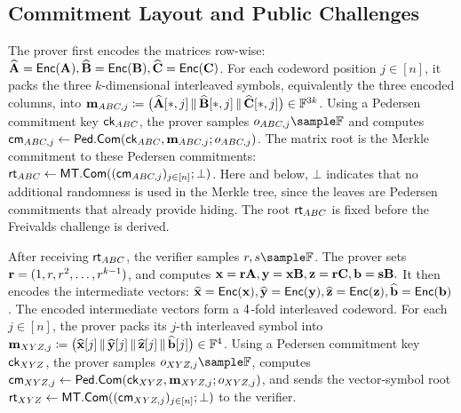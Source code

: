 \subsection{Commitment Layout and Public Challenges}
\label{sec:commitment-challenge}

The prover first encodes the matrices row-wise:
{\footnotesize
\(\widehat{\mathbf{A}}=\mathsf{Enc}(\mathbf{A}),
  \widehat{\mathbf{B}}=\mathsf{Enc}(\mathbf{B}),
  \widehat{\mathbf{C}}=\mathsf{Enc}(\mathbf{C})\).
}
For each codeword position \(j\in[n]\), it packs the three \(k\)-dimensional
interleaved symbols, equivalently the three encoded columns, into
{\footnotesize
\(\mathbf{m}_{ABC,j}
  \coloneqq
  \big(
    \widehat{\mathbf{A}}[*,j]\,
    \|\,\widehat{\mathbf{B}}[*,j]\,
    \|\,\widehat{\mathbf{C}}[*,j]
  \big)
  \in\mathbb{F}^{3k}\).
}
Using a Pedersen commitment key \({\textsf{ck}}_{ABC}\), the prover samples
\(o_{ABC,j}\sample\mathbb{F}\) and computes
{\footnotesize
\(\textsf{cm}_{ABC,j}
  \gets
  \textsf{Ped.Com}({\textsf{ck}}_{ABC},\mathbf{m}_{ABC,j};o_{ABC,j})\).
}
The matrix root is the Merkle commitment to these Pedersen commitments:
{\footnotesize
\(\textsf{rt}_{ABC}
  \gets
  \textsf{MT.Com}((\textsf{cm}_{ABC,j})_{j\in[n]};\bot)\).
}
Here and below, \(\bot\) indicates that no additional randomness is used in the
Merkle tree, since the leaves are Pedersen commitments that already provide
hiding. The root \(\textsf{rt}_{ABC}\) is fixed before the Freivalds challenge is
derived.

After receiving \(\textsf{rt}_{ABC}\), the verifier samples \(r, \revmath{s}\sample\mathbb{F}\). 
The prover sets {\footnotesize \(\mathbf{r}=(1,r,r^2,\ldots,r^{k-1})\), }
and computes
{\footnotesize
\(\mathbf{x}=\mathbf{r}\mathbf{A},
  \mathbf{y}=\mathbf{x}\mathbf{B},
  \mathbf{z}=\mathbf{r}\mathbf{C},
  \mathbf{b}=\mathbf{s}\mathbf{B}.
  \)
}
It then encodes the intermediate vectors:
{\footnotesize
\(\widehat{\mathbf{x}}=\mathsf{Enc}(\mathbf{x}),
  \widehat{\mathbf{y}}=\mathsf{Enc}(\mathbf{y}),
  \widehat{\mathbf{z}}=\mathsf{Enc}(\mathbf{z}),
  \widehat{\mathbf{b}}=\mathsf{Enc}(\mathbf{b})\).
}
The encoded intermediate vectors form a \(4\)-fold interleaved codeword.  For
each \(j\in[n]\), the prover packs its \(j\)-th interleaved symbol into
{\footnotesize
\(\mathbf{m}_{XYZ,j}
  \coloneqq
  \big(
    \widehat{\mathbf{x}}[j]\,
    \|\,\widehat{\mathbf{y}}[j]\,
    \|\,\widehat{\mathbf{z}}[j]\,
    \|\,\widehat{\mathbf{b}}[j]
  \big)
  \in\mathbb{F}^{4}\).
}
Using a Pedersen commitment key \({\textsf{ck}}_{XYZ}\), the prover samples
\(o_{XYZ,j}\sample\mathbb{F}\), computes
{\footnotesize
\(\textsf{cm}_{XYZ,j}
  \gets
  \textsf{Ped.Com}({\textsf{ck}}_{XYZ},\mathbf{m}_{XYZ,j};o_{XYZ,j})\),
}
and sends the vector-symbol root
{\footnotesize
\(\textsf{rt}_{XYZ}
  \gets
  \textsf{MT.Com}((\textsf{cm}_{XYZ,j})_{j\in[n]};\bot)\)
}
to the verifier.

